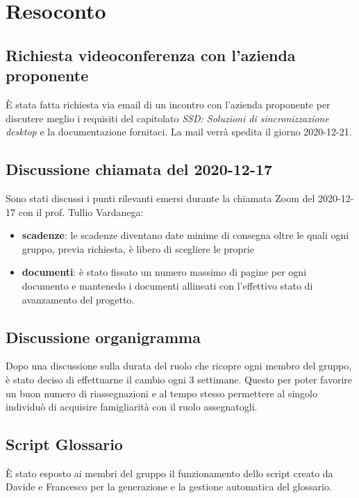 \newpage


\section{Resoconto}

\subsection{Richiesta videoconferenza con l'azienda proponente}

È stata fatta richiesta via email di un incontro con l'azienda proponente per discutere meglio i requisiti del capitolato \textit{SSD: Soluzioni di sincronizzazione desktop} e la documentazione fornitaci.  
La mail verrà spedita il giorno 2020-12-21.

\subsection{Discussione chiamata del 2020-12-17}

Sono stati discussi i punti rilevanti emersi durante la chiamata Zoom del 2020-12-17 con il prof. Tullio Vardanega:
\begin{itemize}
	\item \textbf{scadenze}: le scadenze diventano date minime di consegna oltre le quali ogni gruppo, previa richiesta, è libero di scegliere le proprie 
	\item \textbf{documenti}: è stato fissato un numero massimo di pagine per ogni documento e mantenedo i documenti allineati con l'effettivo stato di avanzamento del progetto. 
\end{itemize}

\subsection{Discussione organigramma}

Dopo una discussione sulla durata del ruolo che ricopre ogni membro del gruppo, è stato deciso di effettuarne il cambio ogni 3 settimane.
Questo per poter favorire un buon numero di riassegnazioni e al tempo stesso permettere al singolo individuò di acquisire famigliarità con il ruolo assegnatogli.

\subsection{Script Glossario}

È stato esposto ai membri del gruppo il funzionamento dello script creato da Davide e Francesco per la generazione e la gestione automatica del glossario.


